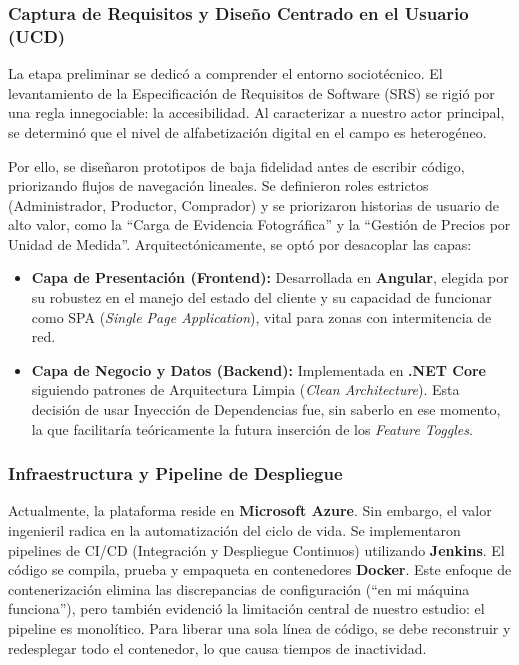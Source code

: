 \subsubsection{Captura de Requisitos y Diseño Centrado en el Usuario (UCD)}

La etapa preliminar se dedicó a comprender el entorno sociotécnico. El levantamiento de la Especificación de Requisitos de Software (SRS) se rigió por una regla innegociable: la accesibilidad. Al caracterizar a nuestro actor principal, se determinó que el nivel de alfabetización digital en el campo es heterogéneo.

Por ello, se diseñaron prototipos de baja fidelidad antes de escribir código, priorizando flujos de navegación lineales. Se definieron roles estrictos (Administrador, Productor, Comprador) y se priorizaron historias de usuario de alto valor, como la ``Carga de Evidencia Fotográfica'' y la ``Gestión de Precios por Unidad de Medida''. Arquitectónicamente, se optó por desacoplar las capas:

\begin{itemize}
    \item \textbf{Capa de Presentación (Frontend):} Desarrollada en \textbf{Angular}, elegida por su robustez en el manejo del estado del cliente y su capacidad de funcionar como SPA (\textit{Single Page Application}), vital para zonas con intermitencia de red.
    \item \textbf{Capa de Negocio y Datos (Backend):} Implementada en \textbf{.NET Core} siguiendo patrones de Arquitectura Limpia (\textit{Clean Architecture}). Esta decisión de usar Inyección de Dependencias fue, sin saberlo en ese momento, la que facilitaría teóricamente la futura inserción de los \textit{Feature Toggles}.
\end{itemize}

\subsubsection{Infraestructura y Pipeline de Despliegue}

Actualmente, la plataforma reside en \textbf{Microsoft Azure}. Sin embargo, el valor ingenieril radica en la automatización del ciclo de vida. Se implementaron pipelines de CI/CD (Integración y Despliegue Continuos) utilizando \textbf{Jenkins}. El código se compila, prueba y empaqueta en contenedores \textbf{Docker}. Este enfoque de contenerización elimina las discrepancias de configuración (``en mi máquina funciona''), pero también evidenció la limitación central de nuestro estudio: el pipeline es monolítico. Para liberar una sola línea de código, se debe reconstruir y redesplegar todo el contenedor, lo que causa tiempos de inactividad.

